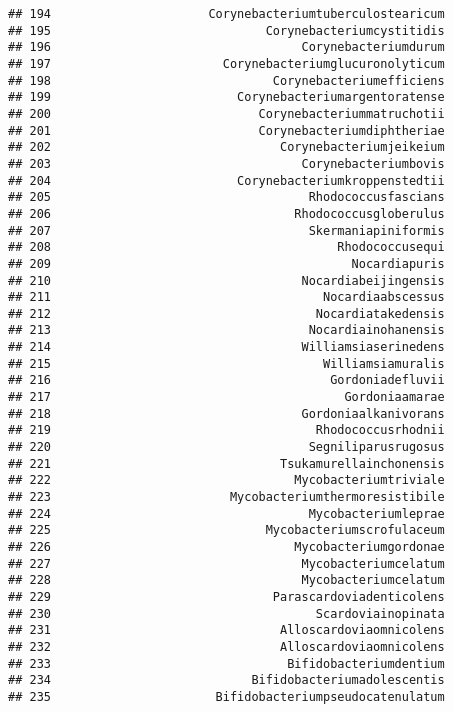 \documentclass[
]{article}
\begin{document}
\begin{verbatim}
## 194                      Corynebacteriumtuberculostearicum
## 195                              Corynebacteriumcystitidis
## 196                                   Corynebacteriumdurum
## 197                        Corynebacteriumglucuronolyticum
## 198                               Corynebacteriumefficiens
## 199                          Corynebacteriumargentoratense
## 200                             Corynebacteriummatruchotii
## 201                             Corynebacteriumdiphtheriae
## 202                                Corynebacteriumjeikeium
## 203                                   Corynebacteriumbovis
## 204                          Corynebacteriumkroppenstedtii
## 205                                    Rhodococcusfascians
## 206                                  Rhodococcusgloberulus
## 207                                    Skermaniapiniformis
## 208                                        Rhodococcusequi
## 209                                          Nocardiapuris
## 210                                   Nocardiabeijingensis
## 211                                      Nocardiaabscessus
## 212                                     Nocardiatakedensis
## 213                                    Nocardiainohanensis
## 214                                   Williamsiaserinedens
## 215                                      Williamsiamuralis
## 216                                       Gordoniadefluvii
## 217                                         Gordoniaamarae
## 218                                   Gordoniaalkanivorans
## 219                                     Rhodococcusrhodnii
## 220                                    Segniliparusrugosus
## 221                                Tsukamurellainchonensis
## 222                                  Mycobacteriumtriviale
## 223                         Mycobacteriumthermoresistibile
## 224                                    Mycobacteriumleprae
## 225                              Mycobacteriumscrofulaceum
## 226                                  Mycobacteriumgordonae
## 227                                   Mycobacteriumcelatum
## 228                                   Mycobacteriumcelatum
## 229                               Parascardoviadenticolens
## 230                                     Scardoviainopinata
## 231                                Alloscardoviaomnicolens
## 232                                Alloscardoviaomnicolens
## 233                                 Bifidobacteriumdentium
## 234                            Bifidobacteriumadolescentis
## 235                       Bifidobacteriumpseudocatenulatum

\end{verbatim}
\end{document}
